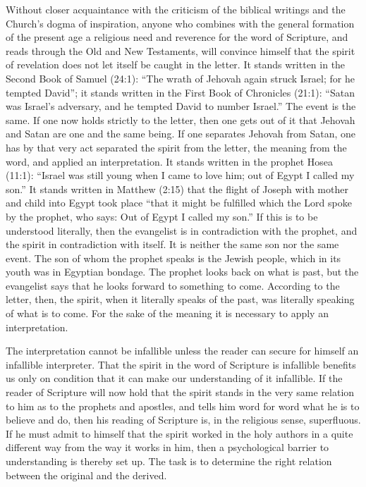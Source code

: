 \documentclass[12pt,a4paper,openany]{book}
\newcommand{\opage}[1]{\marginnote{\footnotesize\textit{[#1]}}}
\begin{document}
Without closer acquaintance with the criticism of the biblical writings
and the Church's dogma of inspiration, anyone who combines with the
general formation of the present age a religious need and reverence for
the word of Scripture, and reads through the Old and New Testaments,
will convince himself that the spirit of revelation does not let itself
be caught in the letter. It stands written in the Second Book of Samuel
(24:1): ``The wrath of Jehovah again struck Israel; for he tempted
David''; it stands written in the First Book of Chronicles (21:1):
``Satan was Israel's adversary, and he tempted David to number Israel.''
The event is the same. If one now holds strictly to the letter, then one
gets out of it that Jehovah and Satan are one and the same being. If one
separates Jehovah from Satan, one has by that very act separated the
spirit from the letter, the meaning from the word, and applied an
interpretation. It stands written in the prophet Hosea (11:1): ``Israel
was still young when I came to love him; out of Egypt I called my son.''
It stands written in Matthew (2:15) that the flight of Joseph with mother
and child into Egypt took place ``that it might be fulfilled which the
Lord spoke by the prophet, who says: Out of Egypt I called my son.'' %
If this is to be understood literally, then the evangelist is in
contradiction with the prophet, and the spirit in contradiction with
itself. It is neither the same son nor the same event. The son of whom
the prophet speaks is the Jewish people, which in its youth was in
Egyptian bondage. The prophet \opage{36}looks back on what is past, but the
evangelist says that he looks forward to something to come. According to
the letter, then, the spirit, when it literally speaks of the past, was
literally speaking of what is to come. For the sake of the meaning it is
necessary to apply an interpretation.

The interpretation cannot be infallible unless the reader can secure for
himself an infallible interpreter. That the spirit in the word of
Scripture is infallible benefits us only on condition that it can make
our understanding of it infallible. If the reader of Scripture will now
hold that the spirit stands in the very same relation to him as to the
prophets and apostles, and tells him word for word what he is to believe
and do, then his reading of Scripture is, in the religious sense,
superfluous. If he must admit to himself that the spirit worked in the
holy authors in a quite different way from the way it works in him, then
a psychological barrier to understanding is thereby set up. The task is
to determine the right relation between the original and the derived.
\end{document}
